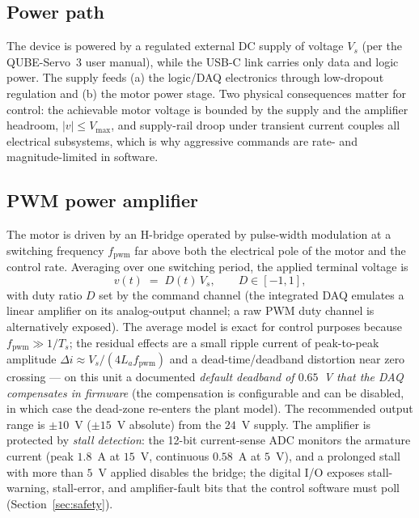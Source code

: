 \documentclass[conference]{IEEEtran}
\begin{document}
\subsection{Power path}
The device is powered by a regulated external DC supply of voltage $V_s$ (per the QUBE-Servo~3 user manual), while the USB-C link carries only data and logic power. The supply feeds (a) the logic/DAQ electronics through low-dropout regulation and (b) the motor power stage. Two physical consequences matter for control: the achievable motor voltage is bounded by the supply and the amplifier headroom, $|v|\le V_{\max}$, and supply-rail droop under transient current couples all electrical subsystems, which is why aggressive commands are rate- and magnitude-limited in software.

\subsection{PWM power amplifier}
The motor is driven by an H-bridge operated by pulse-width modulation at a switching frequency $f_{\mathrm{pwm}}$ far above both the electrical pole of the motor and the control rate. Averaging over one switching period, the applied terminal voltage is
\begin{equation}
v(t) \;=\; D(t)\,V_s,\qquad D\in[-1,1],
\end{equation}
with duty ratio $D$ set by the command channel (the integrated DAQ emulates a linear amplifier on its analog-output channel; a raw PWM duty channel is alternatively exposed). The average model is exact for control purposes because $f_{\mathrm{pwm}}\gg 1/T_s$; the residual effects are a small ripple current of peak-to-peak amplitude $\Delta i \approx V_s/(4 L_a f_{\mathrm{pwm}})$ and a dead-time/deadband distortion near zero crossing --- on this unit a documented \emph{default deadband of $0.65$~V that the DAQ compensates in firmware} (the compensation is configurable and can be disabled, in which case the dead-zone re-enters the plant model). The recommended output range is $\pm10$~V ($\pm15$~V absolute) from the $24$~V supply. The amplifier is protected by \emph{stall detection}: the 12-bit current-sense ADC monitors the armature current (peak $1.8$~A at $15$~V, continuous $0.58$~A at $5$~V), and a prolonged stall with more than $5$~V applied disables the bridge; the digital I/O exposes stall-warning, stall-error, and amplifier-fault bits that the control software must poll (Section~\ref{sec:safety}).
\end{document}
